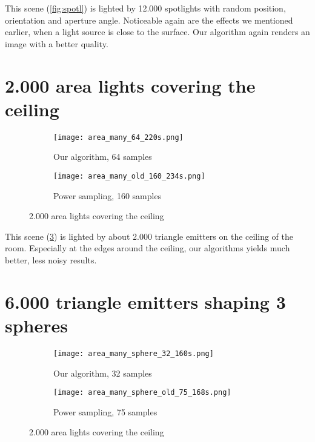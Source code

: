 This scene (\ref{fig:spotl}) is lighted by 12.000 spotlights with random position, orientation and aperture angle. Noticeable again are the effects we mentioned earlier, when a light source is close to the surface. Our algorithm again renders an image with a better quality.

\section{2.000 area lights covering the ceiling}

\begin{figure}
	\centering
	\begin{subfigure}{.5\textwidth}
		\centering
		\texttt{[image: area\_many\_64\_220s.png]}
		\caption{Our algorithm, 64 samples}
		\label{fig:area1}
	\end{subfigure}%
	\begin{subfigure}{.5\textwidth}
		\centering
		\texttt{[image: area\_many\_old\_160\_234s.png]}
		\caption{Power sampling, 160 samples}
		\label{fig:area2}
	\end{subfigure}
	\caption{2.000 area lights covering the ceiling}
	\label{fig:area}
\end{figure}

This scene (\ref{fig:area}) is lighted by about 2.000 triangle emitters on the ceiling of the room. Especially at the edges around the ceiling, our algorithms yields much better, less noisy results.

\section{6.000 triangle emitters shaping 3 spheres}

\begin{figure}
	\centering
	\begin{subfigure}{.5\textwidth}
		\centering
		\texttt{[image: area\_many\_sphere\_32\_160s.png]}
		\caption{Our algorithm, 32 samples}
		\label{fig:area3}
	\end{subfigure}%
	\begin{subfigure}{.5\textwidth}
		\centering
		\texttt{[image: area\_many\_sphere\_old\_75\_168s.png]}
		\caption{Power sampling, 75 samples}
		\label{fig:area4}
	\end{subfigure}
	\caption{2.000 area lights covering the ceiling}
	\label{fig:areal}
\end{figure}

